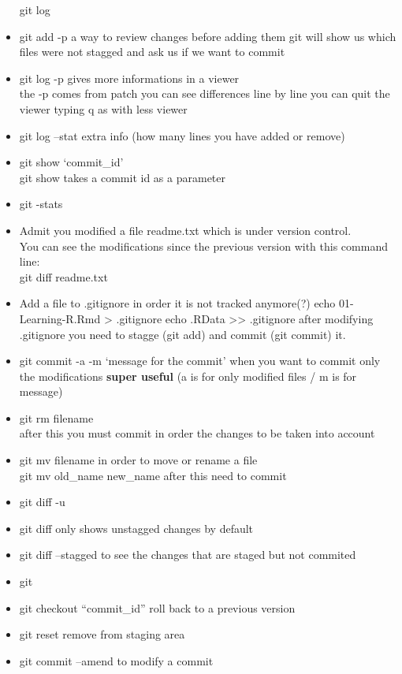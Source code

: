 \documentclass[
]{book}
\begin{document}
\begin{itemize}
  git log
\item
  git add -p
  a way to review changes before adding them
  git will show us which files were not stagged and ask us if we want to commit
\item
  git log -p gives more informations in a viewer\\
  the -p comes from patch
  you can see differences line by line
  you can quit the viewer typing q as with less viewer
\item
  git log --stat
  extra info (how many lines you have added or remove)
\item
  git show `commit\_id'\\
  git show takes a commit id as a parameter
\item
  git -stats
\item
  Admit you modified a file readme.txt which is under version control.\\
  You can see the modifications since the previous version with this command line:\\
  git diff readme.txt
\item
  Add a file to .gitignore in order it is not tracked anymore(?)
  echo 01-Learning-R.Rmd \textgreater{} .gitignore
  echo .RData \textgreater\textgreater{} .gitignore
  after modifying .gitignore you need to stagge (git add) and commit (git commit) it.
\item
  git commit -a -m `message for the commit'
  when you want to commit only the modifications \textbf{super useful}
  (a is for only modified files / m is for message)
\item
  git rm filename\\
  after this you must commit in order the changes to be taken into account
\item
  git mv filename in order to move or rename a file\\
  git mv old\_name new\_name
  after this need to commit
\item
  git diff -u
\item
  git diff only shows unstagged changes by default
\item
  git diff --stagged to see the changes that are staged but not commited
\item
  git
\item
  git checkout ``commit\_id''
  roll back to a previous version
\item
  git reset
  remove from staging area
\item
  git commit --amend
  to modify a commit
\end{itemize}
\end{document}
